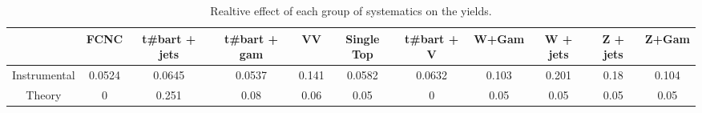 \begin{table}[htbp]
\begin{center}
\begin{tabular}{|c|c|c|c|c|c|c|c|c|c|c|}
\hline 
      & FCNC      & t#bar{t} + jets      & t#bar{t} +  gam      & VV      & Single Top      & t#bar{t} + V      & W+Gam      & W + jets      & Z + jets      & Z+Gam \\ 
\hline 
 Instrumental & 0.0524 & 0.0645 & 0.0537 & 0.141 & 0.0582 & 0.0632 & 0.103 & 0.201 & 0.18 & 0.104 \\ 
 Theory & 0 & 0.251 & 0.08 & 0.06 & 0.05 & 0 & 0.05 & 0.05 & 0.05 & 0.05 \\ 
\hline 
\end{tabular} 
\caption{Realtive effect of each group of systematics on the yields.} 
\end{center} 
\end{table} 
